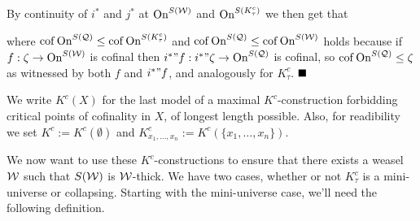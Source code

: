 \begin{center}
\end{center}

By continuity of $i^*$ and $j^*$ at $\operatorname{On}^{S(\operatorname{\mathcal{W}})}$ and $\operatorname{On}^{S(K^c_\tau)}$ we then get that

where $\operatorname{cof}\operatorname{On}^{S(\operatorname{\mathcal{Q}})}\leq\operatorname{cof}\operatorname{On}^{S(K_\tau^c)}$ and $\operatorname{cof}\operatorname{On}^{S(\operatorname{\mathcal{Q}})}\leq\operatorname{cof}\operatorname{On}^{S(\operatorname{\mathcal{W}})}$ holds because if $f:\zeta\to\operatorname{On}^{S(\operatorname{\mathcal{W}})}$ is cofinal then $i^*"f:i^*"\zeta\to\operatorname{On}^{S(\operatorname{\mathcal{Q}})}$ is cofinal, so $\operatorname{cof}\operatorname{On}^{S(\operatorname{\mathcal{Q}})}\leq\zeta$ as witnessed by both $f$ and $i^*"f$, and analogously for $K^c_\tau$.
$\qed$\\




We write $K^c(X)$ for the last model of a maximal $K^c$-construction forbidding critical points of cofinality in $X$, of longest length possible. Also, for readibility we set $K^c:=K^c(\emptyset)$ and $K^c_{x_1,\hdots,x_n}:=K^c(\{x_1,\hdots,x_n\})$.

\qquad We now want to use these $K^c$-constructions to ensure that there exists a weasel $\operatorname{\mathcal{W}}$ such that $S(\operatorname{\mathcal{W}})$ is $\operatorname{\mathcal{W}}$-thick. We have two cases, whether or not $K^c_\tau$ is a mini-universe or collapsing. Starting with the mini-universe case, we'll need the following definition.


